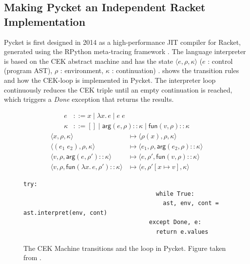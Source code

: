 
\subsection{Making Pycket an Independent Racket Implementation}
\label{subsec:pycket}

Pycket is first designed in 2014 as a high-performance JIT compiler
for Racket, generated using the RPython meta-tracing framework
\cite{bolz14-racket}. The language interpreter is based on the CEK
abstract machine and has the state $\langle e, \rho, \kappa \rangle$ ($e$ : control
(program AST), $\rho$ : environment, $\kappa$ : continuation)
\cite{felleisen87}.  shows the transition rules and
how the CEK-loop is implemented in Pycket. The interpreter loop
continuously reduces the CEK triple until an empty continuation is
reached, which triggers a \emph{Done} exception that returns the
results.

\begin{figure}[h!]
  \small
\begin{align*}
e &::= x \mid \lambda x.\, e \mid e \; e\\
\kappa &::= [] \mid \mathsf{arg}(e,\rho){::}\kappa \mid \mathsf{fun}(v,\rho){::}\kappa
\end{align*}
\begin{align*}
\langle x, \rho, \kappa \rangle & \longmapsto
    \langle \rho(x), \rho, \kappa \rangle \\
\langle (e_1 \; e_2), \rho, \kappa \rangle & \longmapsto
    \langle e_1, \rho, \mathsf{arg}(e_2, \rho){::}\kappa \rangle \\
\langle v, \rho, \mathsf{arg}(e,\rho'){::}\kappa \rangle & \longmapsto
    \langle e, \rho', \mathsf{fun}(v,\rho){::}\kappa \rangle \\
\langle v, \rho, \mathsf{fun}(\lambda x. \, e, \rho'){::}\kappa \rangle & \longmapsto
    \langle e, \rho'[x\mapsto v], \kappa \rangle
\end{align*}
\begin{lstlisting}[mathescape]
                                    try:
                                      while True:
                                        ast, env, cont = ast.interpret(env, cont)
                                    except Done, e:
                                      return e.values
\end{lstlisting}
\caption{The CEK Machine transitions and the loop in Pycket. Figure taken from \cite{pycket15}.}
\label{fig:cek}
\end{figure}

